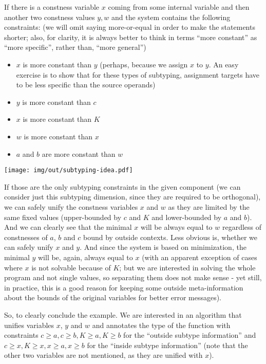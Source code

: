 If there is a constness variable $x$ coming from some internal variable and then another two constness values $y, w$ and the system contains the following constraints: (we will omit saying more-or-equal in order to make the statements shorter; also, for clarity, it is always better to think in terms ``more constant'' as ``more specific'', rather than, ``more general'')

\begin{itemize}
    \item $x$ is more constant than $y$ (perhaps, because we assign $x$ to $y$. An easy exercise is to show that for these types of subtyping, assignment targets have to be less specific than the source operands)
    \item $y$ is more constant than $c$
    \item $x$ is more constant than $K$
    \item $w$ is more constant than $x$
    \item $a$ and $b$ are more constant than $w$
\end{itemize}

\centerline{\texttt{[image: img/out/subtyping-idea.pdf]}}

If those are the only subtyping constraints in the given component (we can consider just this subtyping dimension, since they are required to be orthogonal), we can safely unify the constness variables $x$ and $w$ as they are limited by the same fixed values (upper-bounded by $c$ and $K$ and lower-bounded by $a$ and $b$). And we can clearly see that the minimal $x$ will be always equal to $w$ regardless of constnesses of $a$, $b$ and $c$ bound by outside contexts. Less obvious is, whether we can safely unify $x$ and $y$. And since the system is based on minimization, the minimal $y$ will be, again, always equal to $x$ (with an apparent exception of cases where $x$ is not solvable because of $K$; but we are interested in solving the whole program and not single values, so separating them does not make sense - yet still, in practice, this is a good reason for keeping some outside meta-information about the bounds of the original variables for better error messages).

So, to clearly conclude the example. We are interested in an algorithm that unifies variables $x$, $y$ and $w$ and annotates the type of the function with constraints $c \geq a, c \geq b, K \geq a, K \geq b$ for the ``outside subtype information'' and $c \geq x, K \geq x, x \geq a, x \geq b$ for the ``inside subtype information'' (note that the other two variables are not mentioned, as they are unified with $x$).

